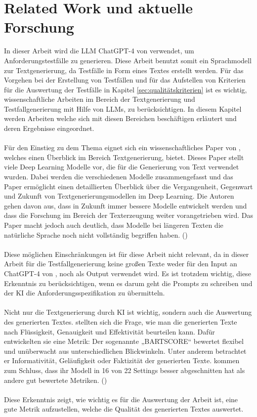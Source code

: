 \documentclass[12pt,toc=bib,toc=listof]{scrreprt}
\begin{document}
\chapter{Related Work und aktuelle Forschung} %
\label{sec:relatedWorkUndAktuelleForschung}
In dieser Arbeit wird die LLM ChatGPT-4 von \textcite{OpenAI2025} verwendet, um Anforderungstestfälle zu generieren. Diese Arbeit benutzt somit ein Sprachmodell zur Textgenerierung, da Testfälle in Form eines Textes erstellt werden. Für das Vorgehen bei der Erstellung von Testfällen und für das Aufstellen von Kriterien für die Auswertung der Testfälle in Kapitel \ref{sec:qualitätskriterien} ist es wichtig, wissenschaftliche Arbeiten im Bereich der Textgenerierung und Testfallgenerierung mit Hilfe von LLMs, zu berücksichtigen. In diesem Kapitel werden Arbeiten welche sich mit diesen Bereichen beschäftigen erläutert und deren Ergebnisse eingeordnet.\\
\\
Für den Einstieg zu dem Thema eignet sich ein wissenschaftliches Paper von \textcite{Iqbal2022}, welches einen Überblick im Bereich Textgenerierung, bietet. Dieses Paper stellt viele Deep Learning Modelle vor, die für die Generierung von Text verwendet wurden. Dabei werden die verschiedenen Modelle zusammengefasst und das Paper ermöglicht einen detaillierten Überblick über die Vergangenheit, Gegenwart und Zukunft von Textgenerierungsmodellen im Deep Learning. Die Autoren \textcite{Iqbal2022} gehen davon aus, dass in Zukunft immer bessere Modelle entwickelt werden und dass die Forschung im Bereich der Texterzeugung weiter vorangetrieben wird. Das Paper macht jedoch auch deutlich, dass Modelle bei längeren Texten die natürliche Sprache noch nicht vollständig begriffen haben. (\cite{Iqbal2022})\\
\\
Diese möglichen Einschränkungen ist für diese Arbeit nicht relevant, da in dieser Arbeit für die Testfallgenerierung keine großen Texte weder für den Input an ChatGPT-4 von \textcite{OpenAI2025}, noch als Output verwendet wird. Es ist trotzdem wichtig, diese Erkenntnis zu berücksichtigen, wenn es darum geht die Prompts zu schreiben und der KI die Anforderungsspezifikation zu übermitteln.\\
\\
Nicht nur die Textgenerierung durch KI ist wichtig, sondern auch die Auswertung des generierten Textes. \textcite{Yuan2021} stellten sich die Frage, wie man die generierten Texte nach Flüssigkeit, Genauigkeit und Effektivität beurteilen kann. Dafür entwickelten sie eine Metrik: Der sogenannte „BARTSCORE“ bewertet flexibel und unüberwacht aus unterschiedlichen Blickwinkeln. Unter anderem betrachtet er Informativität, Geläufigkeit oder Faktizität der generierten Texte. \textcite{Yuan2021} kommen zum Schluss, dass ihr Modell in 16 von 22 Settings besser abgeschnitten hat als andere gut bewertete Metriken. (\cite{Yuan2021})\\
\\
Diese Erkenntnis zeigt, wie wichtig es für die Auswertung der Arbeit ist, eine gute Metrik aufzustellen, welche die Qualität des generierten Textes auswertet.\\
\newpage
\end{document}
